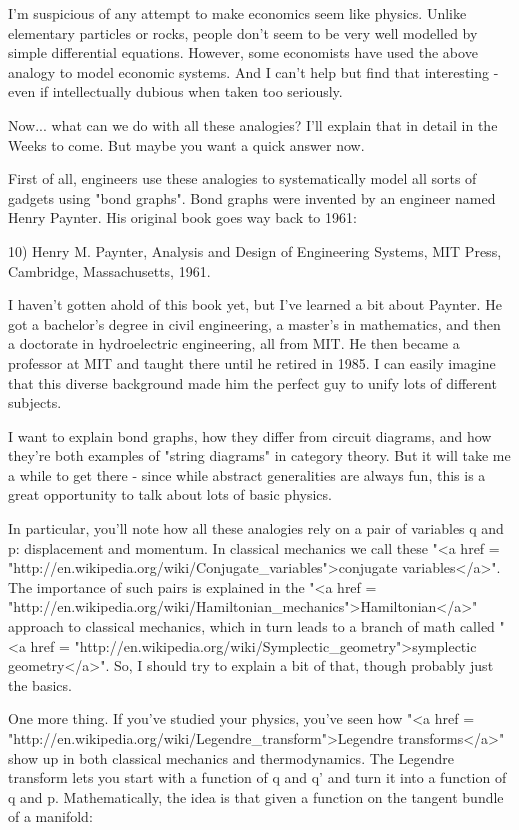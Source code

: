 I'm suspicious of any attempt to make economics seem like physics.
Unlike elementary particles or rocks, people don't seem to be very
well modelled by simple differential equations.  However,
some economists have used the above analogy to model economic systems.
And I can't help but find that interesting - even if intellectually
dubious when taken too seriously.

Now... what can we do with all these analogies?  I'll explain that 
in detail in the Weeks to come.  But maybe you want a quick answer
now.  

First of all, engineers use these analogies to systematically model
all sorts of gadgets using "bond graphs".  Bond graphs were invented
by an engineer named Henry Paynter.  His original book goes way back
to 1961:

10) Henry M. Paynter, Analysis and Design of Engineering Systems, MIT
Press, Cambridge, Massachusetts, 1961.

I haven't gotten ahold of this book yet, but I've learned a bit about
Paynter.  He got a bachelor's degree in civil engineering, a master's in
mathematics, and then a doctorate in hydroelectric engineering, all
from MIT.  He then became a professor at MIT and taught there until he
retired in 1985.  I can easily imagine that this diverse background
made him the perfect guy to unify lots of different subjects.

I want to explain bond graphs, how they differ from circuit diagrams,
and how they're both examples of "string diagrams" in
category theory.  But it will take me a while to get there - since
while abstract generalities are always fun, this is a great
opportunity to talk about lots of basic physics.

In particular, you'll note how all these analogies rely on a pair of
variables q and p: displacement and momentum.  In classical mechanics
we call these "<a href =
"http://en.wikipedia.org/wiki/Conjugate_variables">conjugate
variables</a>".  The importance of such pairs is explained in the
"<a href =
"http://en.wikipedia.org/wiki/Hamiltonian_mechanics">Hamiltonian</a>"
approach to classical mechanics, which in turn leads to a branch of
math called "<a href =
"http://en.wikipedia.org/wiki/Symplectic_geometry">symplectic
geometry</a>".  So, I should try to explain a bit of that, though
probably just the basics.

One more thing.  If you've studied your physics, you've seen how
"<a href =
"http://en.wikipedia.org/wiki/Legendre_transform">Legendre
transforms</a>" show up in both classical mechanics and
thermodynamics.  The Legendre transform lets you start with a function
of q and q' and turn it into a function of q and p.  Mathematically,
the idea is that given a function on the tangent bundle of a manifold:

